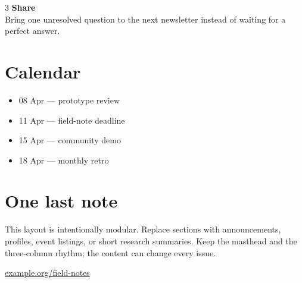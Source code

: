 \documentclass[10pt]{article}
\begin{document}
\begin{multicols*}{3}
\medskip\textbf{Share}\\
Bring one unresolved question to the next newsletter instead of waiting for a perfect answer.

\section*{Calendar}
\begin{itemize}
  \item 08 Apr — prototype review
  \item 11 Apr — field-note deadline
  \item 15 Apr — community demo
  \item 18 Apr — monthly retro
\end{itemize}

\section*{One last note}
This layout is intentionally modular. Replace sections with announcements, profiles, event listings, or short research summaries. Keep the masthead and the three-column rhythm; the content can change every issue.

\vfill
\begin{center}\sffamily\small\color{muted}\href{https://example.org}{example.org/field-notes}\end{center}
\end{multicols*}
\end{document}
